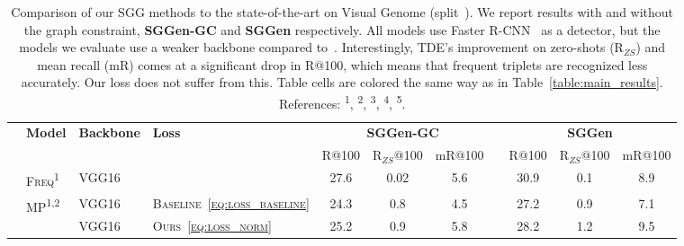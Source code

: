 \begin{table}%
	\caption{\small Comparison of our SGG methods to the state-of-the-art on Visual Genome (split~\citep{xu2017scene}). We report results with and without the graph constraint, \textbf{SGGen-GC} and \textbf{SGGen} respectively. %
		All models use Faster R-CNN~\citep{ren2015faster} as a detector, but the models we evaluate use a weaker backbone compared to~\citep{tang2020unbiased}. Interestingly, TDE's improvement on zero-shots (R$_{ZS}$) and mean recall (mR) comes at a significant drop in R@100, which means that frequent triplets are recognized less accurately. Our loss does not suffer from this. Table cells are colored the same way as in Table~\ref{table:main_results}.
		References: \textsuperscript{1}\citep{zellers2018neural},
		\textsuperscript{2}\citep{xu2017scene},
		\textsuperscript{3}\citep{chen2019knowledge},
		\textsuperscript{4}\citep{zhang2019graphical},
		\textsuperscript{5}\citep{tang2020unbiased}. %
	}\label{table:sggen_results}
	\vspace{-10pt}
	\scriptsize
	\setlength{\tabcolsep}{3pt}
	\begin{center}
		\begin{tabular}{llllccccccc} %
			\toprule
			& \multirow{2}{*}{\textbf{Model}} & \multirow{2}{*}{\textbf{Backbone}} & \multirow{2}{*}{\textbf{Loss}} & \multicolumn{3}{c}{\textbf{SGGen-GC}} & &  \multicolumn{3}{c}{\textbf{SGGen}}\Tstrut\Bstrut\\
			\cline{5-7}\cline{9-11}
			& & & & \tiny R@100 & \tiny R$_{ZS}$@100 & \tiny mR@100 & 
			& \tiny R@100 & \tiny R$_{ZS}$@100 & \tiny mR@100 \Tstrut \Bstrut\\
			\midrule
			& 
			\textsc{Freq}\textsuperscript{1} & VGG16 & & 27.6 & 0.02 & 5.6 & & 30.9 & 0.1 & 8.9\Tstrut\Bstrut \\
			\cline{2-11}
			& \multirow{3}{*}{MP\textsuperscript{1,2}} & VGG16 & \textsc{Baseline~\eqref{eq:loss_baseline}} & 24.3 & 0.8 & \cellcolor{bad}4.5 & & 27.2 & \cellcolor{bad}0.9 & \cellcolor{bad}7.1\Tstrut \\
			& & VGG16 & \textsc{Ours~\eqref{eq:loss_norm}} & 25.2 & 0.9 & \cellcolor{bad}5.8 & & 28.2 & \cellcolor{bad}1.2 & \cellcolor{bad}9.5\Bstrut\\
			

\end{tabular}
\end{center}
\end{table}
